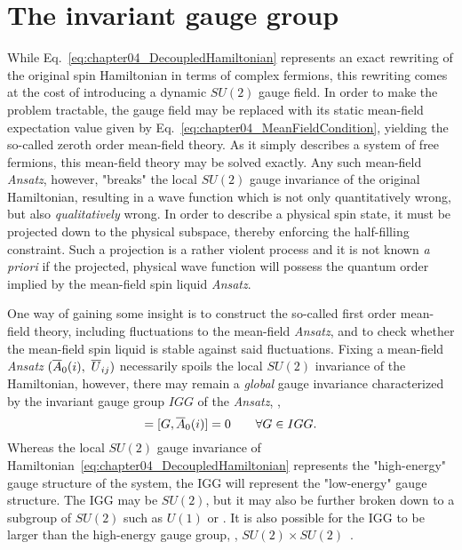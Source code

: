 %
\section{The invariant gauge group}
\label{section:chapter04_TheInvariantGaugeGroup}
%
While Eq.~\eqref{eq:chapter04_DecoupledHamiltonian} represents an exact rewriting of the original spin Hamiltonian in terms of complex fermions, this rewriting comes at the cost of introducing a dynamic $SU(2)$ gauge field.
In order to make the problem tractable, the gauge field may be replaced with its static mean-field expectation value given by Eq.~\eqref{eq:chapter04_MeanFieldCondition}, yielding the so-called zeroth order mean-field theory.
As it simply describes a system of free fermions, this mean-field theory may be solved exactly.
Any such mean-field \textit{Ansatz}, however, "breaks" the local $SU(2)$ gauge invariance of the original Hamiltonian, resulting in a wave function which is not only quantitatively wrong, but also \textit{qualitatively} wrong.
In order to describe a physical spin state, it must be projected down to the physical subspace, thereby enforcing the half-filling constraint.
Such a projection is a rather violent process and it is not known \textit{a priori} if the projected, physical wave function will possess the quantum order implied by the mean-field spin liquid \textit{Ansatz}.

One way of gaining some insight is to construct the so-called first order mean-field theory, including fluctuations to the mean-field \textit{Ansatz}, and to check whether the mean-field spin liquid is stable against said fluctuations.
Fixing a mean-field \textit{Ansatz} $(\overline{A}_0(i),~\overline{U}_{ij})$ necessarily spoils the local $SU(2)$ invariance of the Hamiltonian, however, there may remain a \textit{global} gauge invariance characterized by the invariant gauge group $IGG$ of the \textit{Ansatz}, \ie,
%
\begin{equation}
	[G, \ansatz{U}_{ij}] = [G, \ansatz{A}_0(i)] = 0 \qquad \forall G \in IGG.
\end{equation}
%
Whereas the local $SU(2)$ gauge invariance of Hamiltonian~\eqref{eq:chapter04_DecoupledHamiltonian} represents the "high-energy" gauge structure of the system, the IGG will represent the "low-energy" gauge structure.
The IGG may be $SU(2)$, but it may also be further broken down to a subgroup of $SU(2)$ such as $U(1)$ or \ZZ.
It is also possible for the IGG to be larger than the high-energy gauge group, \eg, $SU(2)\times SU(2)$~\cite{WenPRB2002}.

